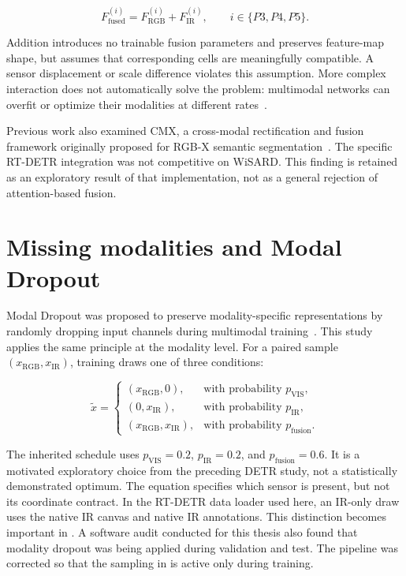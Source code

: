 \begin{equation}
  F_{\mathrm{fused}}^{(i)} = F_{\mathrm{RGB}}^{(i)} + F_{\mathrm{IR}}^{(i)},
  \qquad i\in\{P3,P4,P5\}.
  \label{eq:additive-fusion}
\end{equation}

Addition introduces no trainable fusion parameters and preserves feature-map
shape, but assumes that corresponding cells are meaningfully compatible. A
sensor displacement or scale difference violates this assumption. More complex
interaction does not automatically solve the problem: multimodal networks can
overfit or optimize their modalities at different rates~\cite{wang2020multimodal}.

Previous work also examined CMX, a cross-modal rectification and
fusion framework originally proposed for RGB-X semantic
segmentation~\cite{zhang2023cmx}. The specific RT-DETR integration was not
competitive on WiSARD. This finding is retained as an exploratory result of
that implementation, not as a general rejection of attention-based fusion.

\section{Missing modalities and Modal Dropout}

Modal Dropout was proposed to preserve modality-specific representations by randomly
dropping input channels during multimodal training~\cite{neverova2016moddrop}.
This study applies the same principle at the modality level. For a paired
sample \((x_{\mathrm{RGB}},x_{\mathrm{IR}})\), training draws one of three
conditions:

\begin{equation}
  \widetilde{x}=
  \begin{cases}
    (x_{\mathrm{RGB}},0), & \text{with probability }p_{\mathrm{VIS}},\\
    (0,x_{\mathrm{IR}}), & \text{with probability }p_{\mathrm{IR}},\\
    (x_{\mathrm{RGB}},x_{\mathrm{IR}}), & \text{with probability }p_{\mathrm{fusion}}.
  \end{cases}
  \label{eq:modal-dropout}
\end{equation}

The inherited schedule uses
\(p_{\mathrm{VIS}}=0.2\), \(p_{\mathrm{IR}}=0.2\), and
\(p_{\mathrm{fusion}}=0.6\). It is a motivated exploratory choice from the
preceding DETR study, not a statistically demonstrated optimum. The equation
specifies which sensor is present, but not its coordinate contract. In the
RT-DETR data loader used here, an IR-only draw uses the native IR canvas and
native IR annotations. This distinction becomes important in
. A software audit conducted for this thesis
also found that modality dropout was being applied during validation and test.
The pipeline was corrected so that the sampling in
 is active only during training.

